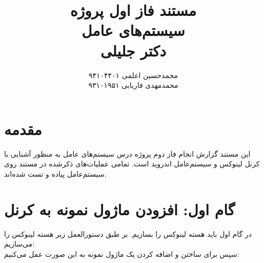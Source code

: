 \documentclass{article}
\title{
مستند فاز اول پروژه
\\
\vspace{4mm}
سیستم‌های عامل
\\
\vspace{2mm}
دکتر جلیلی
}
\author{
محمدحسین اعلمی
\hspace{1cm}
۹۴۱۰۴۴۰۱
\\
محمدمهدی فاریابی
\hspace{1cm}
۹۳۱۰۱۹۵۱
}
\date{}
\begin{document}
\maketitle

\section*{مقدمه}
این مستند گزارش انجام فاز دوم پروژه درس سیستم‌های عامل به منظور آشنایی با کرنل لینوکس و سیستم‌عامل اندروید است. تمامی عملیات‌های ذکر‌شده در مستند روی سیستم‌عامل
پیاده و تست‌ شده‌اند.

\section*{گام اول: افزودن ماژول نمونه به کرنل}

در گام اول باید هسته لینوکس را بسازیم. بر طبق دستورالعمل زیر هسته لینوکس را می‌سازیم:
\\
سپس برای ساختن و اضافه کردن یک ماژول نمونه به این صورت عمل می‌کنیم:
\end{document}
